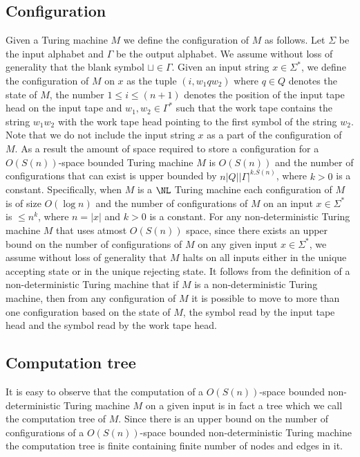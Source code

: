 \documentclass{amsbook}
\theoremstyle{definition}
\theoremstyle{remark}
\numberwithin{section}{chapter}
\numberwithin{equation}{chapter}
\begin{document}
\subsection{Configuration}
Given a Turing machine $M$ we define the configuration of $M$ as follows. Let $\Sigma$ be the input alphabet and $\Gamma$ be the output alphabet. We assume without loss of generality that the blank symbol $\sqcup\in\Gamma$. Given an input string $x\in\Sigma^*$, we define the configuration of $M$ on $x$ as the tuple $(i,w_1qw_2)$ where $q\in Q$ denotes the state of $M$, the number $1\leq i\leq (n+1)$ denotes the position of the input tape head on the input tape and $w_1,w_2\in\Gamma^*$ such that the work tape contains the string $w_1w_2$ with the work tape head pointing to the first symbol of the string $w_2$. Note that we do not include the input string $x$ as a part of the configuration of $M$. As a result the amount of space required to store a configuration for a $O(S(n))$-space bounded Turing machine $M$ is $O(S(n))$ and the number of configurations that can exist is upper bounded by $n|Q||\Gamma |^{k.S(n)}$, where $k>0$ is a constant. Specifically, when $M$ is a $\NL$ Turing machine each configuration of $M$ is of size $O(\log n)$ and the number of configurations of $M$ on an input $x\in\Sigma^*$ is $\leq n^k$, where $n=|x|$ and $k>0$ is a constant. For any non-deterministic Turing machine $M$ that uses atmost $O(S(n))$ space, since there exists an upper bound on the number of configurations of $M$ on any given input $x\in\Sigma^*$, we assume without loss of generality that $M$ halts on all inputs either in the unique accepting state or in the unique rejecting state. It follows from the definition of a non-deterministic Turing machine that if $M$ is a non-deterministic Turing machine, then from any configuration of $M$ it is possible to move to more than one configuration based on the state of $M$, the symbol read by the input tape head and the symbol read by the work tape head.

\subsection{Computation tree}
It is easy to observe that the computation of a $O(S(n))$-space bounded non-deterministic Turing machine $M$ on a given input is in fact a tree which we call the computation tree of $M$. Since there is an upper bound on the number of configurations of a $O(S(n))$-space bounded non-deterministic Turing machine the computation tree is finite containing finite number of nodes and edges in it.
\end{document}
